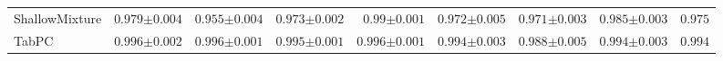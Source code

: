 \begin{tabular}{lrrrrrrr|r}
    ShallowMixture & $0.979${\tiny${\pm 0.004}$} & $0.955${\tiny${\pm 0.004}$} & $0.973${\tiny${\pm 0.002}$} & $0.99${\tiny${\pm 0.001}$} & $0.972${\tiny${\pm 0.005}$} & $0.971${\tiny${\pm 0.003}$} & $0.985${\tiny${\pm 0.003}$} & $0.975$ \\
    TabPC & $0.996${\tiny${\pm 0.002}$} & $0.996${\tiny${\pm 0.001}$} & $0.995${\tiny${\pm 0.001}$} & $0.996${\tiny${\pm 0.001}$} & $0.994${\tiny${\pm 0.003}$} & $0.988${\tiny${\pm 0.005}$} & $0.994${\tiny${\pm 0.003}$} & $0.994$ \\
    \bottomrule[1.0pt]
\end{tabular}